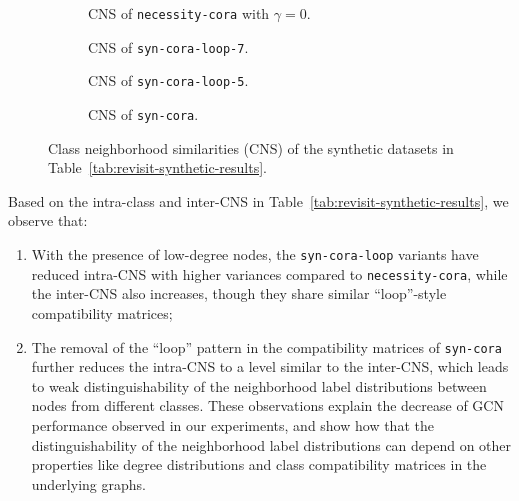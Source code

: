 \begin{figure}[t]
    \centering
    \begin{subfigure}[b]{0.47\textwidth}
        \caption{CNS of \texttt{necessity-cora} with $\gamma=0$.}
    \end{subfigure}
    \hspace{0.04\textwidth}
    \begin{subfigure}[b]{0.47\textwidth}
        \caption{CNS of \texttt{syn-cora-loop-7}.}
    \end{subfigure}

    \begin{subfigure}[b]{0.47\textwidth}
        \caption{CNS of \texttt{syn-cora-loop-5}.}
    \end{subfigure}
    \hspace{0.04\textwidth}
    \begin{subfigure}[b]{0.47\textwidth}
        \caption{CNS of \texttt{syn-cora}.}
    \end{subfigure}
    \caption{Class neighborhood similarities (CNS) of the synthetic datasets in Table~\ref{tab:revisit-synthetic-results}.}
    \label{fig:revisit-dataset-CNS}
\end{figure}

Based on the intra-class and inter-CNS in Table~\ref{tab:revisit-synthetic-results}, we observe that:
\begin{enumerate}[label=(\arabic*)]
\item With the presence of low-degree nodes, the \texttt{syn-cora-loop} variants have reduced intra-CNS with higher variances compared to \texttt{necessity-cora}, while the inter-CNS also increases, though they share similar ``loop''-style compatibility matrices;
\item The removal of the ``loop'' pattern in the compatibility matrices of \texttt{syn-cora} further reduces the intra-CNS to a level similar to the inter-CNS, which leads to weak distinguishability of the neighborhood label distributions between nodes from different classes. 
These observations explain the decrease of GCN performance observed in our experiments, and show how that the distinguishability of the neighborhood label distributions can depend on other properties like degree distributions and class compatibility matrices in the underlying graphs.
\end{enumerate}

